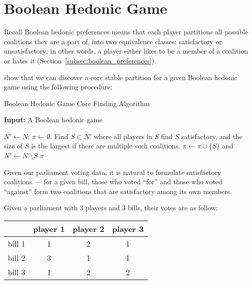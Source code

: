\section{Boolean Hedonic Game}
\label{sec:boolean_hedonic_game}

Recall Boolean hedonic preferences means that each player partitions all possible
coalitions they are a part of, into two equivalence classes:
satisfactory or unsatisfactory; in other words, a player either likes to be
a member of a coalition or hates it (Section~\ref{subsec:boolean_preferences}).

 show that we can discover a core
stable partition for a given Boolean hedonic game using the following procedure:

\begin{algorithm}[htb]
  \caption{Boolean Hedonic Game Core Finding Algorithm}
  \label{alg:boolean_core}
  \textbf{Input:} A Boolean hedonic game
  \begin{algorithmic}[1]

  \State $N' \leftarrow N$; $\pi \leftarrow \emptyset$.
    \State \label{boolean_core:select} Find $S \subset N'$ where all players
      in $S$ find $S$ satisfactory, and the size of $S$ is the largest if there
      are multiple such coalitions.
    \State $\pi \leftarrow \pi \cup \lbrace S \rbrace$ and
      $N' \leftarrow  N' \setminus S$
  \EndWhile
  \State \Return $\pi$

  \end{algorithmic}
\end{algorithm}

Given our parliament voting data, it is natural to formulate satisfactory
coalitions --- for a given bill, those who voted ``for'' and those who voted
``against'' form two coalitions that are satisfactory among its own members.

\begin{example}
\label{example:votes_boolean}
  Given a parliament with 3 players and 3 bills, their votes are as follow:

  \begin{table}[h!]
  \centering
  \begin{tabular}{|c|c|c|c|}
  \hline
         & player 1 & player 2 & player 3 \\ \hline
  bill 1 & 1 & 2 & 1 \\
  bill 2 & 3 & 1 & 1 \\
  bill 3 & 1 & 2 & 2 \\
  \hline
  \end{tabular}
  \end{table}
\end{example}

